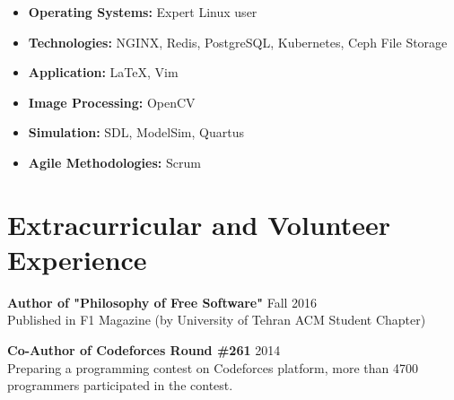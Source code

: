 \documentclass[margin]{res}
\begin{document}
\begin{resume}
	\vspace{3mm}
	
	\begin{itemize}[leftmargin=0mm]
	    \item[] \textbf{Operating Systems:} Expert Linux user
	    \item[] \textbf{Technologies:} NGINX, Redis, PostgreSQL, Kubernetes, Ceph File Storage
	    \item[] \textbf{Application:} \LaTeX, Vim
	    \item[] \textbf{Image Processing:} OpenCV
	    \item[] \textbf{Simulation:} SDL, ModelSim, Quartus
	    \item[] \textbf{Agile Methodologies:} Scrum
	\end{itemize}

\vspace{5mm}

\section{Extracurricular and Volunteer Experience}
   {\bf Author of "Philosophy of Free Software"} \hfill Fall 2016
   \\Published in F1 Magazine (by University of Tehran ACM Student Chapter)

   {\bf Co-Author of Codeforces Round \#261} \hfill 2014
   \\Preparing a programming contest on Codeforces platform, more than 4700 programmers participated in the contest.
   

\end{resume}
\end{document}
